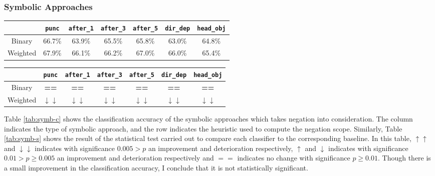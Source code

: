 \subsubsection{Symbolic Approaches}
\begin{table*}[t]
\centering
\caption{Classification Accuracy of Symbolic Approaches with Negation}
\label{tab:symb-c}
\begin{tabular}{|c|c|c|c|c|c|c|}
\hline
 & \texttt{punc}& \texttt{after\_1}& \texttt{after\_3}&  \texttt{after\_5} & \texttt{dir\_dep}& \texttt{head\_obj}   \\ \hline
 Binary & 66.7\%& 63.9\% & 65.5\%  & 65.8\%  & 63.0\% & 64.8\%\\ \hline
 Weighted & 67.9\% & 66.1\% & 66.2\%  & 67.0\% & 66.0\% & 65.4\% \\ \hline
\end{tabular}
\end{table*}
\begin{table*}[t]
\centering
\caption{Significance Results of Symbolic Approaches with Negation}
\label{tab:symb-s}
\begin{tabular}{|c|c|c|c|c|c|c|}
\hline
 & \texttt{punc}& \texttt{after\_1}& \texttt{after\_3}&  \texttt{after\_5} & \texttt{dir\_dep}& \texttt{head\_obj}   \\ \hline
 Binary & \textbf{==}& \textbf{==} & \textbf{==}  & \textbf{==}  & \textbf{==} & \textbf{==}\\ \hline
 Weighted & \textbf{$\downarrow\downarrow$} & \textbf{$\downarrow\downarrow$}  & \textbf{$\downarrow\downarrow$}   & \textbf{$\downarrow\downarrow$}  &\textbf{$\downarrow\downarrow$}  & \textbf{$\downarrow\downarrow$} \\ \hline
\end{tabular}
\end{table*}
Table \ref{tab:symb-c} shows the classification accuracy of the symbolic approaches which takes negation into consideration. The column indicates the type of symbolic approach, and the row indicates the heuristic used to compute the negation scope. Similarly, Table \ref{tab:symb-s} shows the result of the statistical test carried out to compare each classifier to the corresponding baseline. In this table, $\uparrow\uparrow$ and $\downarrow\downarrow$ indicates with significance $ 0.005 > p$ an improvement and deterioration respectively,  $\uparrow$ and $\downarrow$ indicates with significance $ 0.01 > p \geq 0.005$ an improvement and deterioration respectively and $==$ indicates no change with significance $p \geq 0.01$. Though there is a small improvement in the classification accuracy, I conclude that it is not statistically significant.
